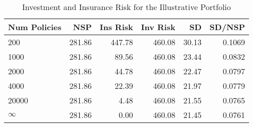 \begin{table}[ht]
\centering
\begingroup\small
\begin{tabular}{lrrrrr}
  \hline
Num Policies & NSP & Ins Risk & Inv Risk & SD & SD/NSP \\ 
  \hline
200 & 281.86 & 447.78 & 460.08 & 30.13 & 0.1069 \\ 
  1000 & 281.86 & 89.56 & 460.08 & 23.44 & 0.0832 \\ 
  2000 & 281.86 & 44.78 & 460.08 & 22.47 & 0.0797 \\ 
  4000 & 281.86 & 22.39 & 460.08 & 21.97 & 0.0779 \\ 
  20000 & 281.86 & 4.48 & 460.08 & 21.55 & 0.0765 \\ 
  $\infty$ & 281.86 & 0.00 & 460.08 & 21.45 & 0.0761 \\ 
   \hline
\end{tabular}
\endgroup
\caption{Investment and Insurance Risk for the Illustrative Portfolio} 
\label{tab:risktable}
\end{table}

